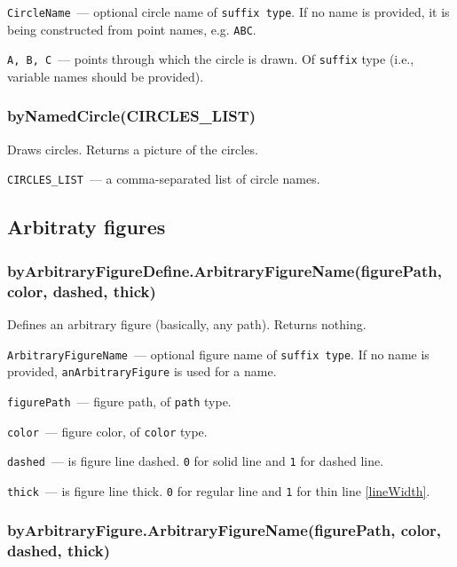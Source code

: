 	\texttt{CircleName}~— optional circle name of \texttt{suffix type}. If no name is provided, it is being constructed from point names, e.g. \texttt{ABC}.
	
	\texttt{A, B, C}~— points through which the circle is drawn. Of \texttt{suffix} type (i.e., variable names should be provided).


\subsubsection{byNamedCircle(CIRCLES\_LIST)}\label{byNamedCircle}
	
	Draws circles. Returns a picture of the circles.
	
	\texttt{CIRCLES\_LIST}~— a comma-separated list of circle names.

\subsection{Arbitraty figures}

\subsubsection{byArbitraryFigureDefine.ArbitraryFigureName(figurePath, col\-or, dashed, thick)}\label{byArbitraryFigureDefine}
	
	Defines an arbitrary figure (basically, any path). Returns nothing.
	
	\texttt{ArbitraryFigureName}~— optional figure name of \texttt{suffix type}. If no name is provided, \texttt{anArbitraryFigure} is used for a name.
	
	\texttt{figurePath}~— figure path, of \texttt{path} type.
	
	\texttt{color}~— figure color, of \texttt{color} type.
	
	\texttt{dashed}~— is figure line dashed. \texttt{0} for solid line and \texttt{1} for dashed line.
	
	\texttt{thick}~— is figure line thick. \texttt{0} for regular line and \texttt{1} for thin line \ref{lineWidth}.

\subsubsection{byArbitraryFigure.ArbitraryFigureName(figurePath, color, dash\-ed, thick)}\label{byArbitraryFigure}

